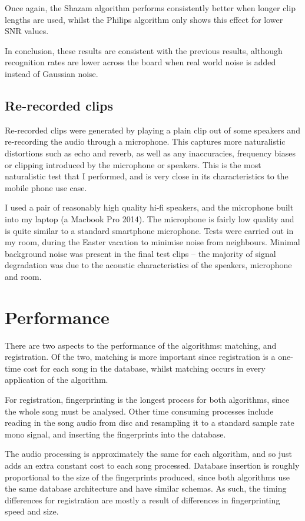 \documentclass[12pt,a4paper,twoside,openright]{report}
\begin{document}
Once again, the Shazam algorithm performs consistently better when longer clip lengths are used, whilst the Philips algorithm only shows this effect for lower SNR values.

In conclusion, these results are consistent with the previous results, although recognition rates are lower across the board when real world noise is added instead of Gaussian noise.


\subsection{Re-recorded clips}

Re-recorded clips were generated by playing a plain clip out of some speakers and re-recording the audio through a microphone. This captures more naturalistic distortions such as echo and reverb, as well as any inaccuracies, frequency biases or clipping introduced by the microphone or speakers. This is the most naturalistic test that I performed, and is very close in its characteristics to the mobile phone use case.

I used a pair of reasonably high quality hi-fi speakers, and the microphone built into my laptop (a Macbook Pro 2014). The microphone is fairly low quality and is quite similar to a standard smartphone microphone. Tests were carried out in my room, during the Easter vacation to minimise noise from neighbours. Minimal background noise was present in the final test clips -- the majority of signal degradation was due to the acoustic characteristics of the speakers, microphone and room.



\section{Performance}

There are two aspects to the performance of the algorithms: matching, and registration. Of the two, matching is more important since registration is a one-time cost for each song in the database, whilst matching occurs in every application of the algorithm. 

For registration, fingerprinting is the longest process for both algorithms, since the whole song must be analysed. Other time consuming processes include reading in the song audio from disc and resampling it to a standard sample rate mono signal, and inserting the fingerprints into the database.

The audio processing is approximately the same for each algorithm, and so just adds an extra constant cost to each song processed. Database insertion is roughly proportional to the size of the fingerprints produced, since both algorithms use the same database architecture and have similar schemas. As such, the timing differences for registration are mostly a result of differences in fingerprinting speed and size.
\end{document}

